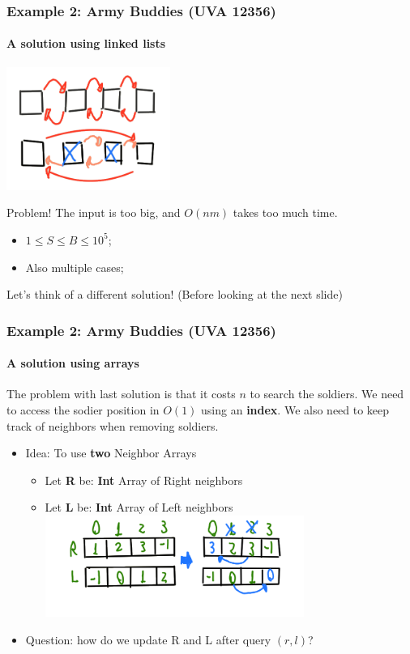 \begin{frame}
  \frametitle{Example 2: Army Buddies (UVA 12356)}
  \framesubtitle{A solution using linked lists}

  \begin{center}
    \includegraphics[width=0.4\textwidth]{img/army-list}
  \end{center}

  \alert{Problem!} The input is too big, and $O(nm)$ takes too much time.

  \begin{itemize}
  \item $1 \leq S \leq B \leq 10^5$;\hfill {}
  \item Also \alert{multiple cases};\hfill {}
  \end{itemize}

  \bigskip

  Let's think of a different solution! (Before looking at the next slide)
\end{frame}


\begin{frame}[t]
  \frametitle{Example 2: Army Buddies (UVA 12356)}
  \framesubtitle{A solution using arrays}

  The problem with last solution is that it costs $n$ to search the soldiers. We need to access the sodier position in $O(1)$ using an {\bf index}. We also need to keep track of neighbors when removing soldiers.

  \begin{itemize}
  \item \alert{Idea}: To use {\bf two} Neighbor Arrays
    \begin{itemize}
    \item Let {\bf R} be: {\bf Int} Array of Right neighbors
    \item Let {\bf L} be: {\bf Int} Array of Left neighbors
      \includegraphics[width=0.7\textwidth]{img/army-array}
    \end{itemize}
  \item \alert{Question}: how do we update R and L after query $(r,l)$?\\
  \end{itemize}
\end{frame}

